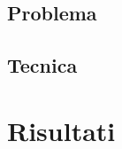 \documentclass[a4paper,12pt,twoside,openright]{report}
\newenvironment{algo}[3]{
  \IncMargin{1.3em}
  \begin{algorithm}
    \SetAlgorithmName{Algoritmo}{}{}
    \DontPrintSemicolon
    \caption{#1}
    \vspace{0.1em}
    \Indmm\Indmm
    \Input{#2}
    \Output{#3}
    \Indpp\Indpp
    \vspace{0.1em}
}{
  \end{algorithm}
  \DecMargin{1.3em}
}
\begin{document}
\subsection{Problema}

\subsection{Tecnica}

\section{Risultati}




% 
% 
% 
% 

% 
% 
\end{document}
